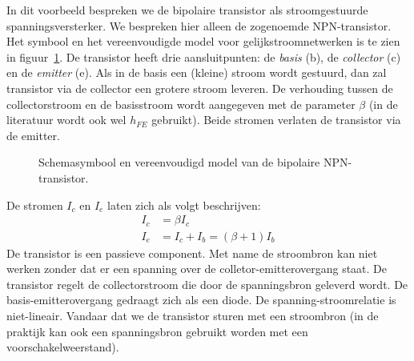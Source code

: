 \begin{example}
In dit voorbeeld bespreken we de bipolaire transistor als stroomgestuurde spanningsversterker. We bespreken hier alleen de zogenoemde NPN-transistor. Het symbool en het vereenvoudigde model voor gelijkstroomnetwerken is te zien in figuur~\ref{fig:gelnpntransistor1}. De transistor heeft drie aansluitpunten: de \textsl{basis} (b), de \textsl{collector} (c) en de \textsl{emitter} (e). Als in de basis een (kleine) stroom wordt gestuurd, dan zal transistor via de collector een grotere stroom leveren. De verhouding tussen de collectorstroom en de basisstroom wordt aangegeven met de parameter $\beta$ (in de literatuur wordt ook wel $h_{FE}$ gebruikt). Beide stromen verlaten de transistor via de emitter.

\begin{figure}[H]
\centering
{}
\caption{Schemasymbool en vereenvoudigd model van de bipolaire NPN-transistor.}
\label{fig:gelnpntransistor1}
\end{figure}

De stromen $I_c$ en $I_e$ laten zich als volgt beschrijven:
%
\begin{equation}
\begin{split}
I_c &= \beta I_c \\
I_e &= I_c + I_b = (\beta + 1)I_b
\end{split}
\end{equation}
%
De transistor is een passieve component. Met name de stroombron kan niet werken zonder dat er een spanning over de colletor-emitterovergang staat. De transistor regelt de collectorstroom die door de spanningsbron geleverd wordt.
De basis-emitterovergang gedraagt zich als een diode. De spanning-stroomrelatie is niet-lineair. Vandaar dat we de transistor sturen met een stroombron (in de praktijk kan ook een spanningsbron gebruikt worden met een voorschakelweerstand).


\end{example}
